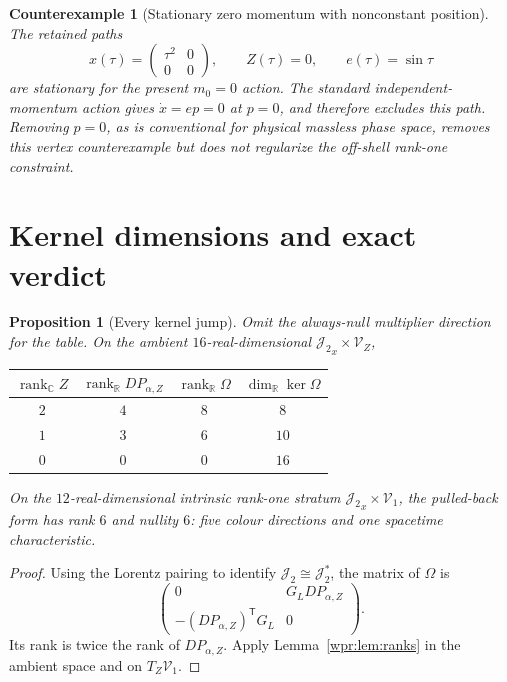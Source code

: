 \documentclass[11pt]{article}
\newtheorem{proposition}[theorem]{Proposition}
\newtheorem{counterexample}[theorem]{Counterexample}
\newcommand{\J}{\mathcal J_2}
\newcommand{\V}{\mathscr V}
\newcommand{\rankC}{\operatorname{rank}_{\mathbb C}}
\begin{document}
\begin{counterexample}[Stationary zero momentum with nonconstant
position]
\label{wpr:ce:zero}
The retained paths
\[
 x(\tau)=\begin{pmatrix}\tau^2&0\\0&0\end{pmatrix},\qquad
 Z(\tau)=0,\qquad e(\tau)=\sin\tau
\]
are stationary for the present \(m_0=0\) action.  The standard
independent-momentum action gives \(\dot x=e p=0\) at \(p=0\), and
therefore excludes this path.  Removing \(p=0\), as is conventional
for physical massless phase space, removes this vertex counterexample
but does not regularize the off-shell rank-one constraint.
\end{counterexample}

\section{Kernel dimensions and exact verdict}
\begin{proposition}[Every kernel jump]
\label{wpr:prop:kernels}
Omit the always-null multiplier direction for the table.  On the
ambient \(16\)-real-dimensional \({\J}_x\times{\V}_Z\),
\begin{center}
\begin{tabular}{c c c c}
\toprule
\(\rankC Z\)&\(\operatorname{rank}_{\mathbb R}D P_{\alpha,Z}\)&
\(\operatorname{rank}_{\mathbb R}\Omega\)&
\(\dim_{\mathbb R}\ker\Omega\)\\
\midrule
\(2\)&\(4\)&\(8\)&\(8\)\\
\(1\)&\(3\)&\(6\)&\(10\)\\
\(0\)&\(0\)&\(0\)&\(16\)\\
\bottomrule
\end{tabular}
\end{center}
On the \(12\)-real-dimensional intrinsic rank-one stratum
\({\J}_x\times{\V}_1\), the pulled-back form has rank \(6\) and nullity
\(6\): five colour directions and one spacetime characteristic.
\end{proposition}
\begin{proof}
Using the Lorentz pairing to identify \(\J\cong\J^*\), the matrix of
\(\Omega\) is
\[
 \begin{pmatrix}
 0&G_L D P_{\alpha,Z}\\
 -(D P_{\alpha,Z})^{\mathsf T}G_L&0
 \end{pmatrix}.
\]
Its rank is twice the rank of \(D P_{\alpha,Z}\).  Apply
Lemma~\ref{wpr:lem:ranks} in the ambient space and on \(T_Z{\V}_1\).
\end{proof}
\end{document}
